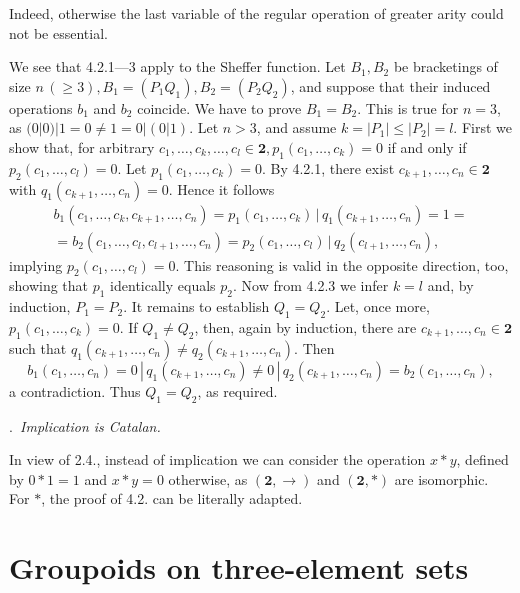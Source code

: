 \documentclass[a4paper,reqno]{amsart}\usepackage{amssymb,latexsym}
\theoremstyle{definition}
\theoremstyle{remark}
\numberwithin{equation}{section}
\numberwithin{theorem}{section}
\begin{document}
\smallskip

Indeed, otherwise the last variable of the regular operation of greater arity
could not be essential.

We see that 4.2.1---3 apply to the Sheffer function. Let $B_{1},B_{2}$ be
bracketings of size $n\,(\geq3),B_{1}=(P_{1}Q_{1}),B_{2}=(P_{2}Q_{2})$, and
suppose that their induced operations $b_{1}$ and $b_{2}$ coincide. We have to
prove $B_{1}=B_{2}$. This is true for $n=3$, as $(0|0)|1=0\neq1=0|(0|1)$. Let
$n>3$, and assume $k=|P_{1}|\leq|P_{2}|=l$. First we show that, for arbitrary
$c_{1},\ldots,c_{k},\ldots,c_{l}\in\mathbf{2},p_{1}(c_{1},\ldots,c_{k})=0$ if
and only if $p_{2}(c_{1},\ldots,c_{l})=0$. Let $p_{1}(c_{1},\ldots,c_{k})=0$.
By 4.2.1, there exist $c_{k+1},\ldots,c_{n}\in\mathbf{2}$ with $q_{1}(c_{k+1},\ldots,c_{n})=0$. Hence it follows
\begin{gather*}
b_{1}(c_{1},\ldots,c_{k},c_{k+1},\dots,c_{n})=p_{1}(c_{1},\ldots
,c_{k})\,|\,q_{1}(c_{k+1},\ldots,c_{n})=1=\\
=b_{2}(c_{1},\ldots,c_{l},c_{l+1},\ldots,c_{n})=p_{2}(c_{1},\ldots
,c_{l})\,|\,q_{2}(c_{l+1},\ldots,c_{n}),
\end{gather*}
implying $p_{2}(c_{1},\ldots,c_{l})=0$. This reasoning is valid in the
opposite direction, too, showing that $p_{1}$ identically equals $p_{2}$. Now
from 4.2.3 we infer $k=l$ and, by induction, $P_{1}=P_{2}$. It remains to
establish $Q_{1}=Q_{2}$. Let, once more, $p_{1}(c_{1},\ldots,c_{k})=0$. If
$Q_{1}\neq Q_{2}$, then, again by induction, there are $c_{k+1},\ldots
,c_{n}\in\mathbf{2}$ such that $q_{1}(c_{k+1},\ldots,c_{n})\neq q_{2}(c_{k+1},\ldots,c_{n})$. Then
\[
b_{1}(c_{1},\ldots,c_{n})=0\,|\,q_{1}(c_{k+1},\ldots,c_{n})\neq0\,|\,q_{2}(c_{k+1},\ldots,c_{n})=b_{2}(c_{1},\ldots,c_{n}),
\]
a contradiction. Thus $Q_{1}=Q_{2}$, as required.

\bigskip

.\textit{\ Implication is Catalan.}

\smallskip

In view of 2.4., instead of implication we can consider the operation $x\ast
y$, defined by $0\ast1=1$ and $x\ast y=0$ otherwise, as $(\mathbf{2},\rightarrow)$ and $(\mathbf{2},\ast)$ are isomorphic. For $\ast$, the proof
of 4.2. can be literally adapted.

\section{Groupoids on three-element sets}
\end{document}
